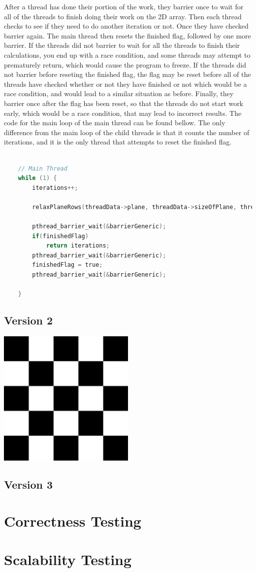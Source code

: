 \documentclass{report}
\begin{document}
After a thread has done their portion of the work, they barrier once to wait for all of the threads to finish doing their work on the 2D array. Then each thread checks to see if they need to do another iteration or not. Once they have checked barrier again. The main thread then resets the finished flag, followed by one more barrier. If the threads did not barrier to wait for all the threads to finish their calculations, you end up with a race condition, and some threads may attempt to prematurely return, which would cause the program to freeze. If the threads did not barrier before reseting the finished flag, the flag may be reset before all of the threads have checked whether or not they have finished or not which would be a race condition, and would lead to a similar situation as before. Finally, they barrier once after the flag has been reset, so that the threads do not start work early, which would be a race condition, that may lead to incorrect results. The code for the main loop of the main thread can be found bellow. The only difference from the main loop of the child threads is that it counts the number of iterations, and it is the only thread that attempts to reset the finished flag.
\begin{lstlisting}[language=C,
    keywordstyle=\color{blue},
    commentstyle=\color{magenta}\itshape,
    emphstyle=\color{red},
    breaklines,
    basicstyle=\ttfamily,
    stringstyle=\color{green},
    identifierstyle=\color{cyan}
    ]

    // Main Thread
    while (1) {
        iterations++;

        relaxPlaneRows(threadData->plane, threadData->sizeOfPlane, threadData->tolerance, startingRow, endingRow);

        pthread_barrier_wait(&barrierGeneric);
        if(finishedFlag)
            return iterations;
        pthread_barrier_wait(&barrierGeneric);
        finishedFlag = true;
        pthread_barrier_wait(&barrierGeneric);

    }
\end{lstlisting}
\section{Version 2}
\includegraphics[width=0.5\textwidth]{checkerboard}
\section{Version 3}
\chapter{Correctness Testing}

\chapter{Scalability Testing}
\end{document}

